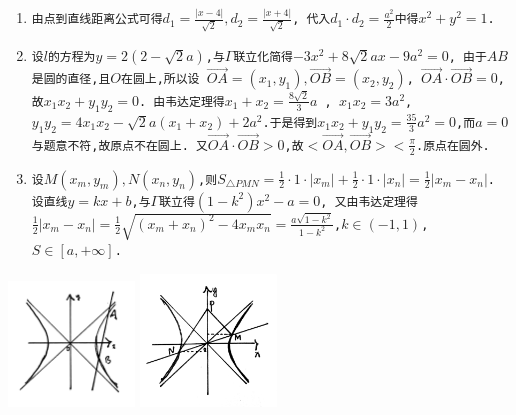 \documentclass{article}
\newcommand{\1}{\underline{\makebox[1cm]{}}}
\newcommand{\2}{\underline{\makebox[2cm]{}}}
\newcommand{\3}{\underline{\makebox[3cm]{}}}
\newcommand{\4}{\underline{\makebox[4cm]{}}}
\newcommand{\lge}{\large \texttt}
\newcommand{\xl}{\overrightarrow}
\newlength{\la}
\begin{document}
\begin{minipage}[b]{0.65\linewidth}
    \begin{enumerate}[(1)]
        \item \lge{由点到直线距离公式可得$d_1 = \frac{|x - 4|}{\sqrt{2}}, d_2 = \frac{|x + 4|}{\sqrt{2}}$, 代入$d_1 \cdot d_2 = \frac{a^2}{2}$中得$x^2 + y^2 = 1$.}
        \item \lge{设$l$的方程为$y = 2(2 - \sqrt{2}a)$,与$\Gamma$联立化简得$-3x^2 +8\sqrt{2}ax - 9a^2 = 0$, 由于$AB$是圆的直径,且$O$在圆上,所以设
        $\xl{OA} = (x_1, y_1), \xl{OB} = (x_2, y_2)$, $\xl{OA} \cdot \xl{OB} = 0$, 故$x_1x_2 + y_1y_2 = 0$. 由韦达定理得$x_1 + x_2 = \frac{8\sqrt{2}}{3}a$
        , $x_1x_2 = 3a^2$, $y_1y_2 = 4x_1x_2 - \sqrt{2}a(x_1 + x_2) + 2a^2$.于是得到$x_1x_2 + y_1y_2 = \frac{35}{3}a^2 = 0$,而$a = 0$与题意不符,故原点不在圆上.
        又$\xl{OA} \cdot \xl{OB} > 0$,故$<\xl{OA}, \xl{OB}> < \frac{\pi}{2}$.原点在圆外.}
        \item \lge{设$M(x_m, y_m), N(x_n, y_n)$,则$S_{\triangle PMN}  = \frac{1}{2} \cdot 1 \cdot |x_m| + \frac{1}{2} \cdot 1 \cdot |x_n| = \frac{1}{2}|x_m - x_n|$.
         设直线$y = kx + b$,与$\Gamma$联立得$(1 - k^2)x^2 - a = 0$, 又由韦达定理得$\frac{1}{2}|x_m - x_n| = \frac{1}{2}\sqrt{(x_m + x_n)^2 - 4x_mx_n} = \frac{a\sqrt{1-k^2}}{1-k^2}$,$k \in (-1, 1)$, $S \in [a, +\infty]$.}
    \end{enumerate}
\end{minipage}
\begin{minipage}[b]{0.25\linewidth}
    \centering
    \includegraphics[height = 95pt]{2.png}
    \hfill
    \includegraphics[height = 100pt]{3.png}
\end{minipage}
\end{document}
